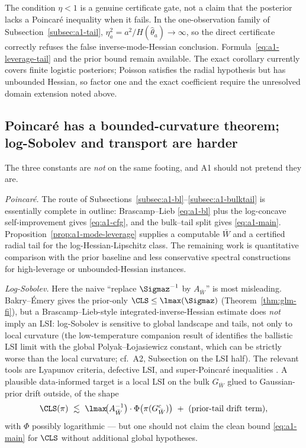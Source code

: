 \documentclass[../../main.tex]{subfiles}
\begin{document}
The condition $\eta<1$ is a genuine certificate gate, not a claim that the posterior lacks a
Poincar\'e inequality when it fails. In the one-observation family of
Subsection~\ref{subsec:a1-tail}, $\eta_a^2=a^2/H(\hat\theta_a)\to\infty$, so the direct certificate
correctly refuses the false inverse-mode-Hessian conclusion. Formula~\eqref{eq:a1-leverage-tail}
and the prior bound remain available. The exact corollary currently covers finite logistic
posteriors; Poisson satisfies the radial hypothesis but has unbounded Hessian, so factor one and
the exact coefficient require the unresolved domain extension noted above.

\subsection{Poincar\'e has a bounded-curvature theorem; log-Sobolev and transport are harder}
\label{subsec:a1-pls}

The three constants are \emph{not} on the same footing, and A1 should not pretend they are.

\emph{Poincar\'e.} The route of Subsections~\ref{subsec:a1-bl}--\ref{subsec:a1-bulktail} is
essentially complete in outline: Brascamp--Lieb \eqref{eq:a1-bl} plus the log-concave
self-improvement \cite{cattiaux2018poincare} gives \eqref{eq:a1-cfg}, and the bulk--tail split
gives \eqref{eq:a1-main}. Proposition~\ref{prop:a1-mode-leverage} supplies a computable $\bar W$
and a certified radial tail for the log-Hessian-Lipschitz class. The remaining work is quantitative
comparison with the prior baseline and less conservative spectral constructions for high-leverage
or unbounded-Hessian instances.

\emph{Log-Sobolev.} Here the naive ``replace $\Sigmaz^{-1}$ by $A_{\bar W}$'' is most misleading.
Bakry--\'Emery gives the prior-only $\CLS\le\lmax(\Sigmaz)$ (Theorem~\ref{thm:glm-fi}), but a Brascamp--Lieb-style
integrated-inverse-Hessian estimate does \emph{not} imply an LSI: log-Sobolev is sensitive to
global landscape and tails, not only to local curvature (the low-temperature companion result of
\cite{ChewiStromme2024Ballistic} identifies the ballistic LSI limit with the global
Polyak--{\L}ojasiewicz constant, which can be strictly worse than the local curvature; cf.\ A2,
Subsection on the LSI half). The relevant tools are Lyapunov criteria, defective LSI, and
super-Poincar\'e inequalities \cite{CattiauxGuillinWangWu2009,BakryCattiauxGuillin2008,CattiauxGuillin2010}.
A plausible data-informed target is a local LSI on the bulk $G_{\bar W}$ glued to Gaussian-prior
drift outside, of the shape
\begin{equation}\label{eq:a1-lsi-target}
  \CLS(\pi)\ \lesssim\ \lmax\!\big(A_{\bar W}^{-1}\big)\cdot\Phi\big(\pi(G_{\bar W}^c)\big)
  \ +\ (\text{prior-tail drift term}),
\end{equation}
with $\Phi$ possibly logarithmic --- but one should not claim the clean bound \eqref{eq:a1-main}
for $\CLS$ without additional global hypotheses.
\end{document}
